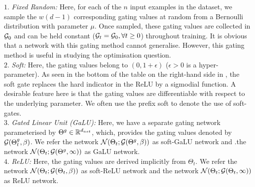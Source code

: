 $1.$ \emph{Fixed Random:} Here, for each of the $n$ input examples in the dataset, we sample the $w(d-1)$ corresponding gating values at random from a Bernoulli distribution with parameter $\mu$. Once sampled, these gating values are collected in $\mathcal{G}_0$ and can be held constant ($\mathcal{G}_t=\mathcal{G}_0,\forall t\geq 0$) throughout training. It is obvious that a network with this gating method cannot generalise. However, this gating method is useful in studying the optimisation question.\\
$2.$ \emph{Soft:} Here, the gating values belong to $(0,1+\epsilon)$ ($\epsilon>0$ is a hyper-parameter). As seen in the bottom of the table on the right-hand side in , the soft gate replaces the hard indicator in the ReLU by a sigmodial function. A desirable feature here is that the gating values are differentiable with respect to the underlying parameter. We often use the prefix soft to denote the use of soft-gates.\\
$3.$ \emph{Gated Linear Unit (GaLU):} Here, we have a separate gating network parameterised by ${\Theta}^g\in\mathbb{R}^{d_{net}}$, which, provides the gating values denoted by $\mathcal{G}({\Theta}^g_t,\beta)$. We refer the network $\mathcal{N}(\Theta_t;\mathcal{G}({\Theta}^g,\beta))$ as soft-GaLU network and .the network $\mathcal{N}(\Theta_t;\mathcal{G}({\Theta}^g,\infty))$ as GaLU network.\\
$4.$ \emph{ReLU:} Here, the gating values are derived implicitly from $\Theta_t$. We refer the network $\mathcal{N}(\Theta_t;\mathcal{G}(\Theta_t,\beta))$ as soft-ReLU network and the network $\mathcal{N}(\Theta_t;\mathcal{G}(\Theta_t,\infty))$ as ReLU network.

